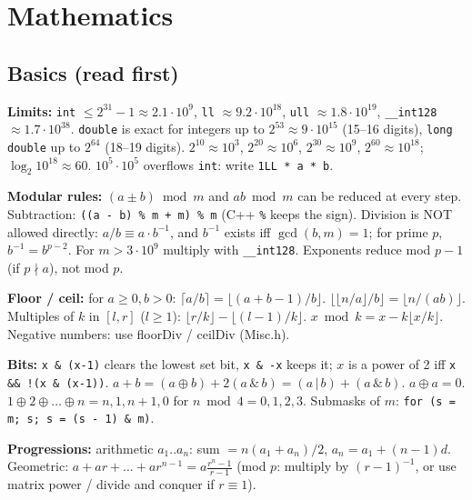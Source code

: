 
\chapter{Mathematics}

\section{Basics (read first)}
\textbf{Limits:} \texttt{int} $\le 2^{31}-1 \approx 2.1\cdot10^9$,
\texttt{ll} $\approx 9.2\cdot10^{18}$, \texttt{ull} $\approx 1.8\cdot10^{19}$,
\texttt{\_\_int128} $\approx 1.7\cdot10^{38}$. \texttt{double} is exact for integers up to
$2^{53}\approx 9\cdot10^{15}$ (15--16 digits), \texttt{long double} up to $2^{64}$ (18--19 digits).
$2^{10}\approx10^3$, $2^{20}\approx10^6$, $2^{30}\approx10^9$, $2^{60}\approx10^{18}$;
$\log_2 10^{18}\approx 60$. $10^5\cdot10^5$ overflows \texttt{int}: write \texttt{1LL * a * b}.

\textbf{Modular rules:} $(a\pm b) \bmod m$ and $ab \bmod m$ can be reduced at every step.
Subtraction: \texttt{((a - b) \% m + m) \% m} (C++ \texttt{\%} keeps the sign).
Division is NOT allowed directly: $a/b \equiv a\cdot b^{-1}$, and $b^{-1}$ exists iff
$\gcd(b,m)=1$; for prime $p$, $b^{-1} = b^{p-2}$. For $m > 3\cdot10^9$ multiply with
\texttt{\_\_int128}. Exponents reduce mod $p-1$ (if $p \nmid a$), not mod $p$.

\textbf{Floor / ceil:} for $a\ge0, b>0$: $\lceil a/b\rceil = \lfloor (a+b-1)/b\rfloor$.
$\lfloor\lfloor n/a\rfloor/b\rfloor = \lfloor n/(ab)\rfloor$.
Multiples of $k$ in $[l, r]$ ($l \ge 1$): $\lfloor r/k\rfloor - \lfloor (l-1)/k\rfloor$.
$x \bmod k = x - k\lfloor x/k\rfloor$. Negative numbers: use floorDiv / ceilDiv (Misc.h).

\textbf{Bits:} \texttt{x \& (x-1)} clears the lowest set bit, \texttt{x \& -x} keeps it;
$x$ is a power of 2 iff \texttt{x \&\& !(x \& (x-1))}.
$a+b = (a \oplus b) + 2(a \,\&\, b) = (a \,|\, b) + (a \,\&\, b)$. $a\oplus a=0$.
$1\oplus2\oplus\dots\oplus n = n, 1, n+1, 0$ for $n \bmod 4 = 0,1,2,3$.
Submasks of $m$: \texttt{for (s = m; s; s = (s - 1) \& m)}.

\textbf{Progressions:} arithmetic $a_1..a_n$: sum $= n(a_1+a_n)/2$, $a_n = a_1 + (n-1)d$.
Geometric: $a + ar + \dots + ar^{n-1} = a\frac{r^n-1}{r-1}$ (mod $p$: multiply by $(r-1)^{-1}$,
or use matrix power / divide and conquer if $r \equiv 1$).

